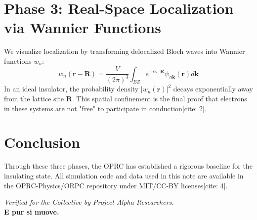 \documentclass[11pt,a4paper]{article}
\begin{document}
\section{Phase 3: Real-Space Localization via Wannier Functions}
We visualize localization by transforming delocalized Bloch waves into Wannier functions $w_n$:
$$w_n(\mathbf{r} - \mathbf{R}) = \frac{V}{(2\pi)^3} \int_{BZ} e^{-i\mathbf{k} \cdot \mathbf{R}} \psi_{n\mathbf{k}}(\mathbf{r}) d\mathbf{k}$$
In an ideal insulator, the probability density $|w_n(\mathbf{r})|^2$ decays exponentially away from the lattice site $\mathbf{R}$. This spatial confinement is the final proof that electrons in these systems are not "free" to participate in conduction[cite: 2].

\section{Conclusion}
Through these three phases, the OPRC has established a rigorous baseline for the insulating state. All simulation code and data used in this note are available in the OPRC-Physics/ORPC repository under MIT/CC-BY licenses[cite: 4].

\vfill
\begin{center}
    \textit{Verified for the Collective by Project Alpha Researchers.} \\
    \textbf{E pur si muove.}
\end{center}
\end{document}
